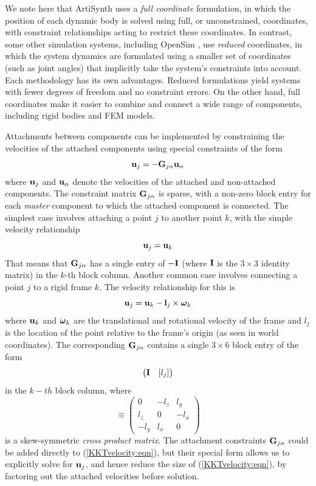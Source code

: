 We note here that ArtiSynth uses a {\it full coordinate} formulation,
in which the position of each dynamic body is solved using full, or
unconstrained, coordinates, with constraint relationships acting to
restrict these coordinates. In contrast, some other simulation
systems, including OpenSim \cite{delp2007opensim}, use {\it reduced}
coordinates, in which the system dynamics are formulated using a
smaller set of coordinates (such as joint angles) that implicitly take
the system's constraints into account. Each methodology has its own
advantages. Reduced formulations yield systems with fewer degrees of
freedom and no constraint errors. On the other hand, full coordinates
make it easier to combine and connect a wide range of components,
including rigid bodies and FEM models.

Attachments between components can be implemented by constraining the
velocities of the attached components using special constraints of the
form
%
\begin{equation}
{\bf u}_j = -{\bf G}_{j\alpha} {\bf u}_\alpha
\label{attachments:eqn}
\end{equation}
%
where ${\bf u}_j$ and ${\bf u}_\alpha$ denote the velocities of the attached and
non-attached components. The constraint matrix ${\bf G}_{j\alpha}$ is
sparse, with a non-zero block entry for each {\it master} component to
which the attached component is connected. The simplest case involves
attaching a point $j$ to another point $k$, with the simple velocity relationship
%
\begin{equation}
{\bf u}_j = {\bf u}_k
\end{equation}
%
That means that ${\bf G}_{j\alpha}$ has a single entry of $-{\bf I}$ (where ${\bf I}$
is the $3 \times 3$ identity matrix) in the $k$-th block column.
Another common case involves connecting a point $j$ to
a rigid frame $k$. The velocity relationship for this is
%
\begin{equation}
{\bf u}_j = {\bf u}_k - {\bf l}_j \times \boldsymbol\omega_k
\end{equation}
%
where ${\bf u}_k$ and $\boldsymbol\omega_k$ are the translational and rotational
velocity of the frame and $l_j$ is the location of the point relative
to the frame's origin (as seen in world coordinates). The corresponding
${\bf G}_{j\alpha}$ contains a single $3 \times 6$ block entry of the form
%
\begin{equation}
\left(\begin{matrix}
{\bf I} & [ l_j ]
\end{matrix}\right)
\end{equation}
%
in the $k-th$ block column, where
%
\begin{equation}
[ l ] \equiv 
\left(\begin{matrix}
0 & -l_z & l_y \\
l_z & 0 & -l_x \\
-l_y & l_x & 0
\end{matrix}\right)
\end{equation}
%
is a skew-symmetric {\it cross product matrix}.
The attachment constraints ${\bf G}_{j\alpha}$ 
could be added directly to
(\ref{KKTvelocity:eqn}), but their special form allows us to
explicitly solve for ${\bf u}_j$, and hence reduce the size of
(\ref{KKTvelocity:eqn}), by factoring out the attached velocities
before solution.

